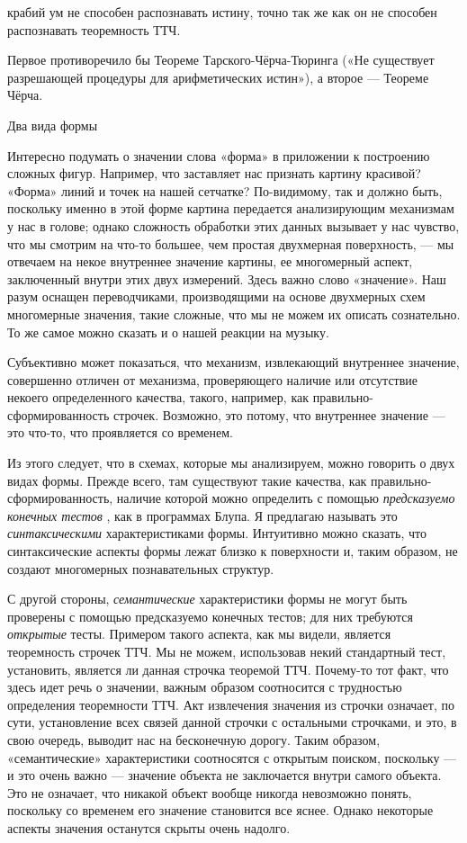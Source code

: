 \documentclass[../main.tex]{subfiles}
\begin{document}
крабий ум не способен распознавать истину, точно так же как он не способен распознавать теоремность ТТЧ.

Первое противоречило бы Теореме Тарского-Чёрча-Тюринга («Не существует разрешающей процедуры для арифметических истин»), а второе --- Теореме Чёрча.

Два вида формы

Интересно подумать о значении слова «форма» в приложении к построению сложных фигур. Например, что заставляет нас признать картину красивой? «Форма» линий и точек на нашей сетчатке? По-видимому, так и должно быть, поскольку именно в этой форме картина передается анализирующим механизмам у нас в голове; однако сложность обработки этих данных вызывает у нас чувство, что мы смотрим на что-то большее, чем простая двухмерная поверхность, --- мы отвечаем на некое внутреннее значение картины, ее многомерный аспект, заключенный внутри этих двух измерений. Здесь важно слово «значение». Наш разум оснащен переводчиками, производящими на основе двухмерных схем многомерные значения, такие сложные, что мы не можем их описать сознательно. То же самое можно сказать и о нашей реакции на музыку.

Субъективно может показаться, что механизм, извлекающий внутреннее значение, совершенно отличен от механизма, проверяющего наличие или отсутствие некоего определенного качества, такого, например, как правильно-сформированность строчек. Возможно, это потому, что внутреннее значение --- это что-то, что проявляется со временем.

Из этого следует, что в схемах, которые мы анализируем, можно говорить о двух видах формы. Прежде всего, там существуют такие качества, как правильно-сформированность, наличие которой можно определить с помощью \emph{предсказуемо конечных тестов} , как в программах Блупа. Я предлагаю называть это \emph{синтаксическими} характеристиками формы. Интуитивно можно сказать, что синтаксические аспекты формы лежат близко к поверхности и, таким образом, не создают многомерных познавательных структур.

С другой стороны, \emph{семантические} характеристики формы не могут быть проверены с помощью предсказуемо конечных тестов; для них требуются \emph{открытые} тесты. Примером такого аспекта, как мы видели, является теоремность строчек ТТЧ. Мы не можем, использовав некий стандартный тест, установить, является ли данная строчка теоремой ТТЧ. Почему-то тот факт, что здесь идет речь о значении, важным образом соотносится с трудностью определения теоремности ТТЧ. Акт извлечения значения из строчки означает, по сути, установление всех связей данной строчки с остальными строчками, и это, в свою очередь, выводит нас на бесконечную дорогу. Таким образом, «семантические» характеристики соотносятся с открытым поиском, поскольку --- и это очень важно --- значение объекта не заключается внутри самого объекта. Это не означает, что никакой объект вообще никогда невозможно понять, поскольку со временем его значение становится все яснее. Однако некоторые аспекты значения останутся скрыты очень надолго.
\end{document}
